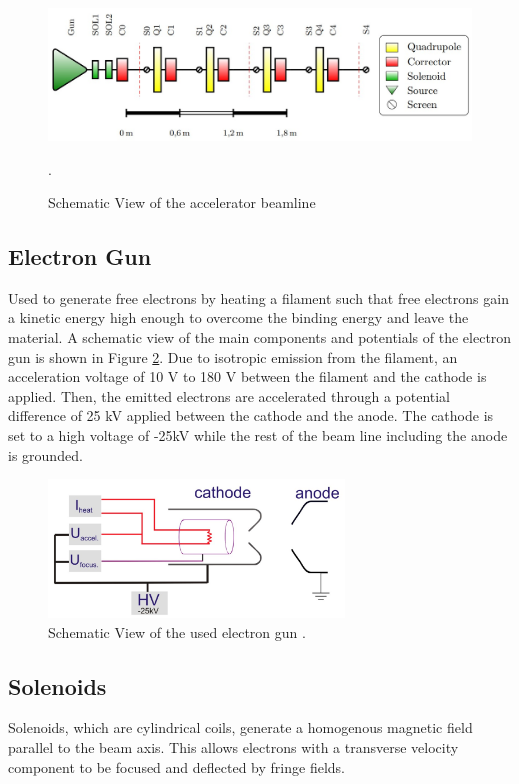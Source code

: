 \documentclass[12pt]{article}
\begin{document}
\begin{figure}[H]
    \centering
    \includegraphics[width = \textwidth]{fig/LAB.jpg}
    \caption{Schematic View of the accelerator beamline \cite{lecturenote}}.
    \label{lab}
\end{figure}

\subsection*{Electron Gun}
Used to generate free electrons by heating a filament such that free electrons gain a kinetic energy high enough to overcome the binding energy and leave the material. A schematic view of the main components and potentials of the electron gun is shown in Figure \ref{electron gun}. Due to isotropic emission from the filament, an acceleration voltage of 10 V to 180 V between the filament and the cathode is applied. Then, the emitted electrons are accelerated through a potential difference of 25 kV applied between the cathode and the anode. The cathode is set to a high voltage of -25kV while the rest of the beam line including the anode is grounded. 

\begin{figure}[H]
    \centering
    \includegraphics[width = 0.7\textwidth]{fig/electron gun.jpg}
    \caption{Schematic View of the used electron gun \cite{lecturenote}.}
    \label{electron gun}
\end{figure}


\subsection*{Solenoids}
Solenoids, which are cylindrical coils, generate a homogenous magnetic field parallel to the beam axis. This allows electrons with a transverse velocity component to be focused and deflected by fringe fields. 
\end{document}
